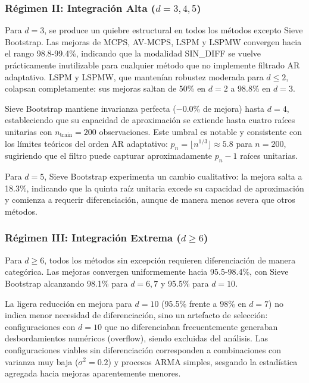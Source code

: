 \subsubsection{\texorpdfstring{Régimen II: Integración Alta ($d = 3, 4, 5$)}{Régimen II: Integración Alta (d = 3, 4, 5)}}

Para $d = 3$, se produce un quiebre estructural en todos los métodos excepto Sieve Bootstrap. Las mejoras de MCPS, AV-MCPS, LSPM y LSPMW convergen hacia el rango 98.8-99.4\%, indicando que la modalidad SIN\_DIFF se vuelve prácticamente inutilizable para cualquier método que no implemente filtrado AR adaptativo. LSPM y LSPMW, que mantenían robustez moderada para $d \leq 2$, colapsan completamente: sus mejoras saltan de 50\% en $d = 2$ a 98.8\% en $d = 3$.

Sieve Bootstrap mantiene invarianza perfecta ($-0.0\%$ de mejora) hasta $d = 4$, estableciendo que su capacidad de aproximación se extiende hasta cuatro raíces unitarias con $n_{\text{train}} = 200$ observaciones. Este umbral es notable y consistente con los límites teóricos del orden AR adaptativo: $p_n = \lfloor n^{1/3} \rfloor \approx 5.8$ para $n = 200$, sugiriendo que el filtro puede capturar aproximadamente $p_n - 1$ raíces unitarias.

Para $d = 5$, Sieve Bootstrap experimenta un cambio cualitativo: la mejora salta a 18.3\%, indicando que la quinta raíz unitaria excede su capacidad de aproximación y comienza a requerir diferenciación, aunque de manera menos severa que otros métodos.

\subsubsection{\texorpdfstring{Régimen III: Integración Extrema ($d \geq 6$)}{Régimen III: Integración Extrema (d >= 6)}}

Para $d \geq 6$, todos los métodos sin excepción requieren diferenciación de manera categórica. Las mejoras convergen uniformemente hacia 95.5-98.4\%, con Sieve Bootstrap alcanzando 98.1\% para $d = 6, 7$ y 95.5\% para $d = 10$. 

La ligera reducción en mejora para $d = 10$ (95.5\% frente a 98\% en $d = 7$) no indica menor necesidad de diferenciación, sino un artefacto de selección: configuraciones con $d = 10$ que no diferenciaban frecuentemente generaban desbordamientos numéricos (overflow), siendo excluidas del análisis. Las configuraciones viables sin diferenciación corresponden a combinaciones con varianza muy baja ($\sigma^2 = 0.2$) y procesos ARMA simples, sesgando la estadística agregada hacia mejoras aparentemente menores.

